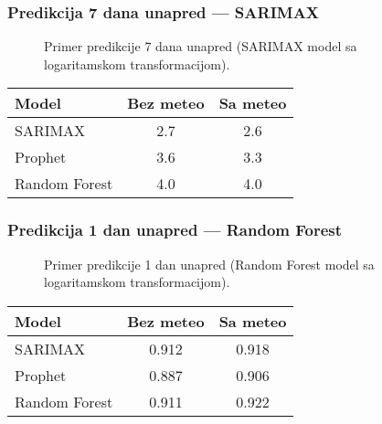 \begin{frame}
    \frametitle{Predikcija 7 dana unapred — SARIMAX}

    \begin{figure}[t]
        \centering
        \hfill
        \caption{Primer predikcije 7 dana unapred (SARIMAX model sa logaritamskom transformacijom).}
    \end{figure}

    \vspace{0.1cm}

    \centering
    \small
    \begin{tabular}{lcc}
        \toprule
        \textbf{Model} & \textbf{Bez meteo} & \textbf{Sa meteo} \\
        \midrule
        SARIMAX & 2.7 & 2.6 \\
        Prophet & 3.6 & 3.3 \\
        Random Forest & 4.0 & 4.0 \\
        \bottomrule
    \end{tabular}

\end{frame}



\begin{frame}
    \frametitle{Predikcija 1 dan unapred — Random Forest}

    \begin{figure}[t]
        \centering
        \hfill
        \caption{Primer predikcije 1 dan unapred (Random Forest model sa logaritamskom transformacijom).}
    \end{figure}

    \vspace{0.1cm}
    \centering
    \small
    \begin{tabular}{lcc}
        \toprule
        \textbf{Model} & \textbf{Bez meteo} & \textbf{Sa meteo} \\
        \midrule
        SARIMAX  & 0.912 & 0.918 \\
        Prophet & 0.887 & 0.906 \\
        Random Forest & 0.911 & 0.922 \\
        \bottomrule
    \end{tabular}
\end{frame}

